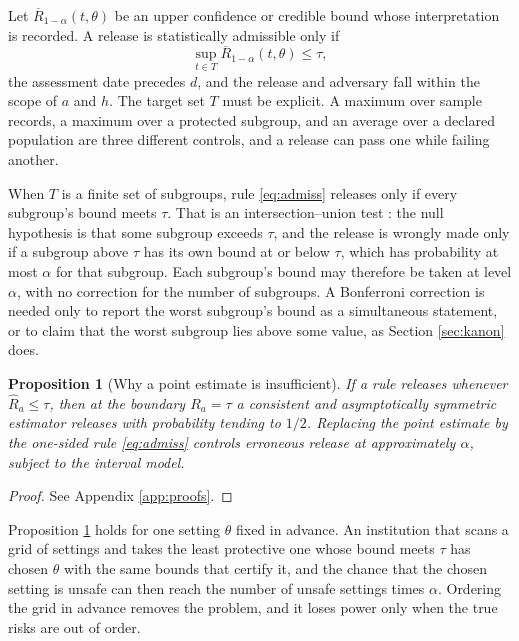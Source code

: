 \documentclass[11pt,a4paper]{article}
\theoremstyle{plain}
\newtheorem{proposition}{Proposition}
\theoremstyle{definition}
\theoremstyle{definition}
\theoremstyle{plain}
\begin{document}
Let $\overline{R}_{1-\alpha}(t, \theta)$ be an upper confidence or credible bound whose
interpretation is recorded. A release is statistically admissible only if
\begin{equation}
\sup_{t \in T} \overline{R}_{1-\alpha}(t, \theta) \leq \tau ,
\label{eq:admiss}
\end{equation}
the assessment date precedes $d$, and the release and adversary fall within the
scope of $a$ and $h$. The target set $T$ must be explicit. A maximum over
sample records, a maximum over a protected subgroup, and an average over a
declared population are three different controls, and a release can pass one
while failing another.

When $T$ is a finite set of subgroups, rule \eqref{eq:admiss} releases only if
every subgroup's bound meets $\tau$. That is an intersection--union test
\citep{berger1982}: the null hypothesis is that some subgroup exceeds $\tau$,
and the release is wrongly made only if a subgroup above $\tau$ has its own
bound at or below $\tau$, which has probability at most $\alpha$ for that
subgroup. Each subgroup's bound may therefore be taken at level $\alpha$, with
no correction for the number of subgroups. A Bonferroni correction is needed
only to report the worst subgroup's bound as a simultaneous statement, or to
claim that the worst subgroup lies above some value, as Section \ref{sec:kanon}
does.

\begin{proposition}[Why a point estimate is insufficient]\label{prop:point}
If a rule releases whenever $\widehat{R}_a \leq \tau$, then at the boundary
$R_a = \tau$ a consistent and asymptotically symmetric estimator releases with
probability tending to $1/2$. Replacing the point estimate by the one-sided
rule \eqref{eq:admiss} controls erroneous release at approximately $\alpha$,
subject to the interval model.
\end{proposition}

\begin{proof}
See Appendix \ref{app:proofs}.
\end{proof}

Proposition \ref{prop:point} holds for one setting $\theta$ fixed in advance.
An institution that scans a grid of settings and takes the least protective one
whose bound meets $\tau$ has chosen $\theta$ with the same bounds that certify
it, and the chance that the chosen setting is unsafe can then reach the number
of unsafe settings times $\alpha$. Ordering the grid in advance removes the
problem, and it loses power only when the true risks are out of order.
\end{document}
